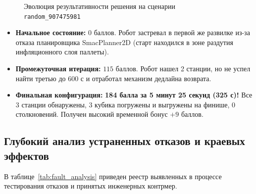 \documentclass[a4paper,11pt]{article}
\begin{document}
\begin{figure}[htbp]
\centering
{}
\caption{Эволюция результативности решения на сценарии \texttt{random\_907475981}}
\label{fig:score_progress}
\end{figure}

\begin{itemize}
    \item \textbf{Начальное состояние:} $0$ баллов. Робот застревал в первой же развилке из-за отказа планировщика SmacPlanner2D (старт находился в зоне раздутия инфляционного слоя паллеты).
    \item \textbf{Промежуточная итерация:} $115$ баллов. Робот нашел 2 станции, но не успел найти третью до 600 с и отработал механизм дедлайна возврата.
    \item \textbf{Финальная конфигурация:} \textbf{184 балла за 5 минут 25 секунд (325 с)!} Все 3 станции обнаружены, 3 кубика погружены и выгружены на финише, 0 столкновений. Получен высокий временной бонус $+9$ баллов.
\end{itemize}

\subsection{Глубокий анализ устраненных отказов и краевых эффектов}
В таблице~\ref{tab:fault_analysis} приведен реестр выявленных в процессе тестирования отказов и принятых инженерных контрмер.
\end{document}
